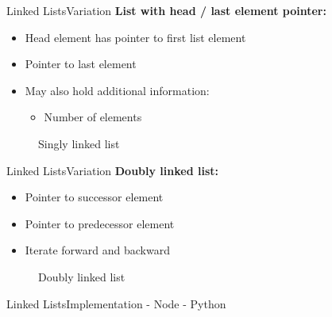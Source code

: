 \begin{frame}{Linked Lists}{Variation}
  \textbf{List with head / last element pointer:}
  \begin{itemize}
    \item
      Head element has pointer to first list element
    \item
      Pointer to last element
    \item
      May also hold additional information:
      \begin{itemize}
        \item
          Number of elements
      \end{itemize}
  \end{itemize}
  \begin{figure}
    
    \caption{Singly linked list}
    \label{fig:linked_list:variation:singly_linked_list_with_head}
  \end{figure}
\end{frame}


\begin{frame}{Linked Lists}{Variation}
  \textbf{Doubly linked list:}
  \begin{itemize}
    \item
      Pointer to successor element
    \item
      Pointer to predecessor element
    \item
      Iterate forward and backward
  \end{itemize}
  \begin{figure}
    
    \caption{Doubly linked list}
    \label{fig:linked_list:variation:doubly_linked_list}
  \end{figure}
\end{frame}


\begin{frame}[fragile]{Linked Lists}{Implementation - Node - Python}
  
\end{frame}


